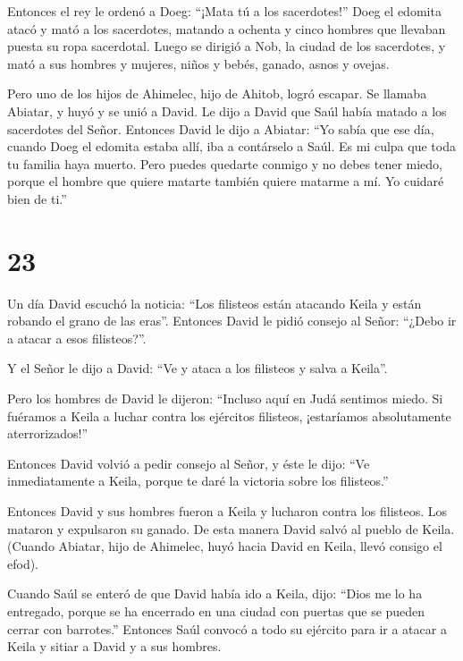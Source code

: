  Entonces el rey le ordenó a Doeg: ``¡Mata tú a los
sacerdotes!'' Doeg el edomita atacó y mató a los sacerdotes, matando a
ochenta y cinco hombres que llevaban puesta su ropa sacerdotal.
 Luego se dirigió a Nob, la ciudad de los sacerdotes, y
mató a sus hombres y mujeres, niños y bebés, ganado, asnos y ovejas.

 Pero uno de los hijos de Ahimelec, hijo de Ahitob, logró
escapar. Se llamaba Abiatar, y huyó y se unió a David.  Le
dijo a David que Saúl había matado a los sacerdotes del Señor.
 Entonces David le dijo a Abiatar: ``Yo sabía que ese día,
cuando Doeg el edomita estaba allí, iba a contárselo a Saúl. Es mi culpa
que toda tu familia haya muerto.  Pero puedes quedarte
conmigo y no debes tener miedo, porque el hombre que quiere matarte
también quiere matarme a mí. Yo cuidaré bien de ti.''

\hypertarget{section-22}{%
\section{23}\label{section-22}}

 Un día David escuchó la noticia: ``Los filisteos están
atacando Keila y están robando el grano de las eras''. 
Entonces David le pidió consejo al Señor: ``¿Debo ir a atacar a esos
filisteos?''.

Y el Señor le dijo a David: ``Ve y ataca a los filisteos y salva a
Keila''.

 Pero los hombres de David le dijeron: ``Incluso aquí en
Judá sentimos miedo. Si fuéramos a Keila a luchar contra los ejércitos
filisteos, ¡estaríamos absolutamente aterrorizados!''

 Entonces David volvió a pedir consejo al Señor, y éste le
dijo: ``Ve inmediatamente a Keila, porque te daré la victoria sobre los
filisteos.''

 Entonces David y sus hombres fueron a Keila y lucharon
contra los filisteos. Los mataron y expulsaron su ganado. De esta manera
David salvó al pueblo de Keila.  (Cuando Abiatar, hijo de
Ahimelec, huyó hacia David en Keila, llevó consigo el efod).

 Cuando Saúl se enteró de que David había ido a Keila, dijo:
``Dios me lo ha entregado, porque se ha encerrado en una ciudad con
puertas que se pueden cerrar con barrotes.''  Entonces Saúl
convocó a todo su ejército para ir a atacar a Keila y sitiar a David y a
sus hombres.


